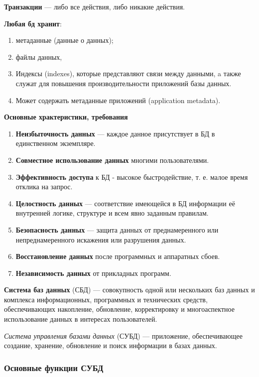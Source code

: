 \textbf{Транзакции} --- либо все действия, либо никакие действия.


\textbf{Любая бд хранит}:

\begin{enumerate}
	\item метаданные (данные о данных);
	\item файлы данных,
	\item Индексы (indexes), которые представляют связи между данными,  a также служат для повышения производительности приложений базы данных.
	\item Может содержать метаданные приложений (application metadata).
\end{enumerate}

\textbf{Основные храктеристики, требования}

\begin{enumerate}
	\item \textbf{Неизбыточность данных} --- каждое данное присутствует в БД в единственном экземпляре.
	\item \textbf{Совместное использование данных} многими пользователями.
	\item \textbf{Эффективность доступа} к БД - высокое быстродействие, т. е. малое время отклика на запрос.
	\item \textbf{Целостность данных} --- соответствие имеющейся в БД информации её внутренней логике, структуре и всем явно заданным правилам.
	\item \textbf{Безопасность данных} --- защита данных от преднамеренного или непреднамеренного искажения или разрушения данных.
	\item \textbf{Восстановление данных} после программных и аппаратных сбоев.
	\item \textbf{Независимость данных} от прикладных программ.
\end{enumerate}

\textbf{Система баз данных} (СБД) --- совокупность одной или нескольких баз данных и комплекса информационных, программных и технических средств, обеспечивающих накопление, обновление, корректировку и многоаспектное использование данных в интересах пользователей.

\textit{Система управления базами данных} (СУБД) --- приложение, обеспечивающее создание, хранение, обновление и поиск информации в базах данных.

\subsubsection{Основные функции СУБД}

